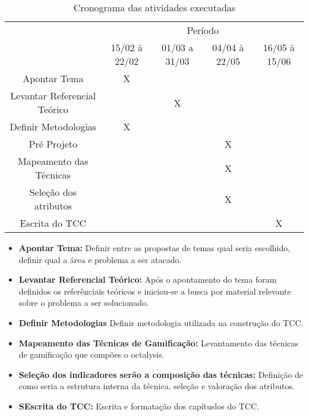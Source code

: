 \begin{table}[!htpb]
\centering

\begin{small} 
  
\setlength{\tabcolsep}{3pt} 


\begin{tabular}{|c|c|c|c|c|}\hline
 & \multicolumn{4}{c|}{Período}\\ \cline{2-5}
\raisebox{1.5ex}{Etapa} & 15/02 à 22/02 & 01/03 a 31/03 & 04/04 à 22/05 & 16/05 à 15/06 \\ \hline

Apontar Tema & X & & & \\ \hline
Levantar Referencial Teórico & & X & & \\ \hline
Definir Metodologias & X & & & \\ \hline
Pré Projeto & & & X & \\ \hline
Mapeamento das Técnicas & & & X &  \\ \hline
Seleção dos atributos & & & X & \\ \hline
Escrita do TCC & & & & X \\ \hline

\end{tabular} 
\end{small}
\caption{Cronograma das atividades executadas}
\label{t_cronograma}
\end{table} 

\begin{itemize}
\item  \textbf {Apontar Tema:} Definir entre as propostas de temas qual seria escolhido,  definir qual a área e problema a ser atacado.
\item  \textbf {Levantar Referencial Teórico:} Após o apontamento do tema foram definidos os referênciais teóricos e iniciou-se a busca por material relevante sobre o problema a ser solucionado.
\item  \textbf {Definir Metodologias} Definir metodologia utilizada na construção do TCC.
\item  \textbf {Mapeamento das Técnicas de Gamificação:} Levantamento das técnicas de gamificação que compões o octalysis.
\item  \textbf {Seleção dos indicadores serão a composição das técnicas:} Definição de como seria a estrutura interna da técnica, seleção e valoração dos atributos.
\item  \textbf{SEscrita do TCC:} Escrita e formatação dos capítuslos do TCC.
\end{itemize}




